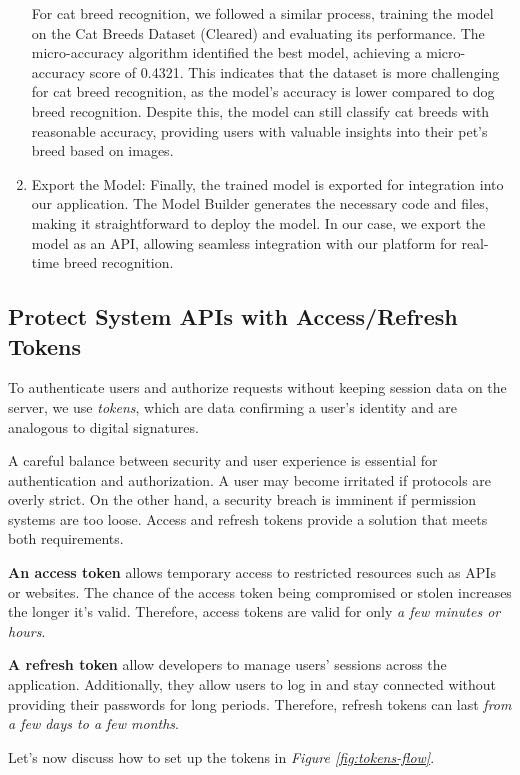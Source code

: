 \begin{enumerate}
    For cat breed recognition, we followed a similar process, training the model on the Cat Breeds Dataset (Cleared)
    and evaluating its performance. The micro-accuracy algorithm identified the best model, achieving a micro-accuracy
    score of 0.4321. This indicates that the dataset is more challenging for cat breed recognition, as the model's accuracy
    is lower compared to dog breed recognition. Despite this, the model can still classify cat breeds with reasonable accuracy,
    providing users with valuable insights into their pet's breed based on images. 

    \item Export the Model: Finally, the trained model is exported for integration into our application. 
    The Model Builder generates the necessary code and files, making it straightforward to deploy the model.
    In our case, we export the model as an API, allowing seamless integration with our platform for real-time breed recognition.
\end{enumerate}

\subsection{Protect System APIs with Access/Refresh Tokens}
To authenticate users and authorize requests without keeping session data on the server, we use \textit{tokens}, which are data confirming a user’s identity and are analogous to digital signatures.

A careful balance between security and user experience is essential for authentication and authorization. A user may become irritated if protocols are overly strict. On the other hand, a security breach is imminent if permission systems are too loose. Access and refresh tokens provide a solution that meets both requirements.

\textbf{An access token} allows temporary access to restricted resources such as APIs or websites. The chance of the access token being compromised or stolen increases the longer it’s valid. Therefore, access tokens are valid for only \textit{a few minutes or hours}.

\textbf{A refresh token} allow developers to manage users’ sessions across the application. Additionally, they allow users to log in and stay connected without providing their passwords for long periods. Therefore, refresh tokens can last \textit{from a few days to a few months}.

Let’s now discuss how to set up the tokens in \textit{Figure \ref{fig:tokens-flow}}.

